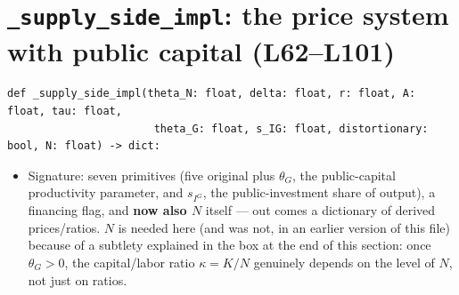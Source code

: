 \documentclass[11pt]{article}
\begin{document}
\section{\texttt{\_supply\_side\_impl}: the price system with public capital (L62--L101)}
\label{sec:supply}

\begin{lstlisting}[firstnumber=62]
def _supply_side_impl(theta_N: float, delta: float, r: float, A: float, tau: float,
                       theta_G: float, s_IG: float, distortionary: bool, N: float) -> dict:
\end{lstlisting}
\begin{itemize}
\item[\textbf{L62--L63}] Signature: seven primitives (five original plus
$\theta_G$, the public-capital productivity parameter, and $s_{I^G}$, the
public-investment share of output), a financing flag, and \textbf{now also
$N$} itself --- out comes a dictionary of derived prices/ratios. $N$ is
needed here (and was not, in an earlier version of this file) because of a
subtlety explained in the box at the end of this section: once
$\theta_G>0$, the capital/labor ratio $\kappa=K/N$ genuinely depends on the
level of $N$, not just on ratios.
\end{itemize}
\end{document}
